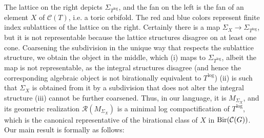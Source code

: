 \documentclass[11pt]{amsart}
\theoremstyle{definition}
\theoremstyle{remark}
\def\log{\mathrm{log}}
\begin{document}
{}

The lattice on the right depicts $\Sigma_{T^{\log}}$, and the fan on the left
is the fan of an element $X$ of $\mathcal{C}(T)$, i.e. a toric orbifold. The
red and blue colors represent finite index sublattices of the lattice on the
right. Certainly there is a map $\Sigma_X \to \Sigma_{T^{\log}}$, but it is not
representable because the lattice structures disagree on at least one cone.
Coarsening the subdivision in the unique way that respects the sublattice
structure, we obtain the object in the middle, which (i) maps to $\Sigma_{T^{\log}}$, albeit the map is not representable, as the integral structures disagree (and hence the corresponding algebraic object
is not birationally equivalent to $T^\log$) (ii) is such that $\Sigma_X$ is obtained from it
by a subdivision that does not alter the integral structure (iii)
cannot be further coarsened. Thus, in our language, it is $M_{\Sigma_X}$, and
its geometric realization $\mathcal{R}(M_{\Sigma_X})$ is a minimal log
compactification of $T^{\log}$, which is the canonical representative of the birational class of $X$ in
$\textup{Bir}(\mathcal{C}(G))$. Our main result is formally as follows:
\end{document}
